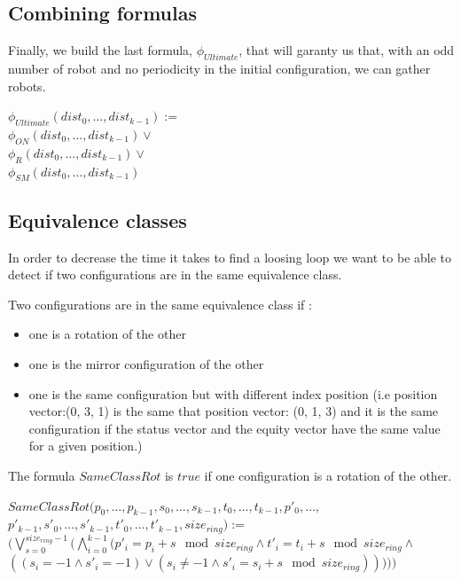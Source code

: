 \documentclass{article}
\begin{document}
\subsection{Combining formulas}

Finally, we build the last formula, $\phi_{Ultimate}$, that will garanty us that, with an odd number of robot and no periodicity in the initial configuration, we can gather robots.

\begin{center}
    
$\phi_{Ultimate}(dist_{0}, \ldots , dist_{k-1}):=$\\
$\phi_{ON}(dist_{0}, \ldots , dist_{k-1}) \lor$\\
$\phi_R(dist_{0}, \ldots , dist_{k-1}) \lor$\\
$\phi_{SM}(dist_{0}, \ldots , dist_{k-1})$
\end{center}

\subsection{Equivalence classes}

In order to decrease the time it takes to find a loosing loop we want to be able to detect if two configurations are in the same equivalence class.

Two configurations are in the same equivalence class if :
\begin{itemize}
    \item one is a rotation of the other
    \item one is the mirror configuration of the other
    \item one is the same configuration but with different index position (i.e position vector:\newline (0, 3, 1) is the same that position vector: (0, 1, 3) and it is the same configuration if the status vector and the equity vector have the same value for a given position.)
\end{itemize}

\noindent The formula $SameClassRot$ is $true$ if one configuration is a rotation of the other.

\begin{center}
    
$SameClassRot(p_{0}, \dots, p_{k-1}, s_{0}, \dots, s_{k-1}, t_{0}, \dots, t_{k-1}, p'_{0}, \dots,$\\
$p'_{k-1}, s'_{0}, \dots, s'_{k-1}, t'_{0}, \dots, t'_{k-1}, size_{ring}):=$\\
$(\bigvee_{s=0}^{size_{ring}-1} ( \bigwedge_{i=0}^{k-1} (p'_{i} = p_{i}+s \mod{size_{ring}} \land t'_{i} = t_{i}+s \mod{size_{ring}} \land$\\
$((s_{i} = -1 \land s'_{i} = -1) \lor (s_{i} \not= -1 \land s'_{i} = s_{i}+s \mod{size_{ring}}) ) ) ))$
\end{center}
\end{document}
